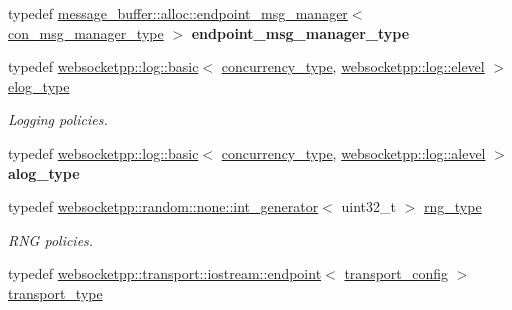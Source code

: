 \begin{DoxyCompactItemize}
\item 
typedef \hyperlink{classwebsocketpp_1_1message__buffer_1_1alloc_1_1endpoint__msg__manager}{message\+\_\+buffer\+::alloc\+::endpoint\+\_\+msg\+\_\+manager}$<$ \hyperlink{classwebsocketpp_1_1message__buffer_1_1alloc_1_1con__msg__manager}{con\+\_\+msg\+\_\+manager\+\_\+type} $>$ {\bfseries endpoint\+\_\+msg\+\_\+manager\+\_\+type}\hypertarget{structwebsocketpp_1_1config_1_1debug__core_a02b1cc8ce11213011104049aeba57866}{}\label{structwebsocketpp_1_1config_1_1debug__core_a02b1cc8ce11213011104049aeba57866}

\item 
typedef \hyperlink{classwebsocketpp_1_1log_1_1basic}{websocketpp\+::log\+::basic}$<$ \hyperlink{classwebsocketpp_1_1concurrency_1_1basic}{concurrency\+\_\+type}, \hyperlink{structwebsocketpp_1_1log_1_1elevel}{websocketpp\+::log\+::elevel} $>$ \hyperlink{structwebsocketpp_1_1config_1_1debug__core_acfa1ded7f80d6a7276b0ec3fd0859fc3}{elog\+\_\+type}\hypertarget{structwebsocketpp_1_1config_1_1debug__core_acfa1ded7f80d6a7276b0ec3fd0859fc3}{}\label{structwebsocketpp_1_1config_1_1debug__core_acfa1ded7f80d6a7276b0ec3fd0859fc3}

\begin{DoxyCompactList}\small\item\em Logging policies. \end{DoxyCompactList}\item 
typedef \hyperlink{classwebsocketpp_1_1log_1_1basic}{websocketpp\+::log\+::basic}$<$ \hyperlink{classwebsocketpp_1_1concurrency_1_1basic}{concurrency\+\_\+type}, \hyperlink{structwebsocketpp_1_1log_1_1alevel}{websocketpp\+::log\+::alevel} $>$ {\bfseries alog\+\_\+type}\hypertarget{structwebsocketpp_1_1config_1_1debug__core_a2e57e38001385110ce0fbbd17af6b0af}{}\label{structwebsocketpp_1_1config_1_1debug__core_a2e57e38001385110ce0fbbd17af6b0af}

\item 
typedef \hyperlink{classwebsocketpp_1_1random_1_1none_1_1int__generator}{websocketpp\+::random\+::none\+::int\+\_\+generator}$<$ uint32\+\_\+t $>$ \hyperlink{structwebsocketpp_1_1config_1_1debug__core_ae59c72992beaef76957c8bfe407394e8}{rng\+\_\+type}\hypertarget{structwebsocketpp_1_1config_1_1debug__core_ae59c72992beaef76957c8bfe407394e8}{}\label{structwebsocketpp_1_1config_1_1debug__core_ae59c72992beaef76957c8bfe407394e8}

\begin{DoxyCompactList}\small\item\em R\+NG policies. \end{DoxyCompactList}\item 
typedef \hyperlink{classwebsocketpp_1_1transport_1_1iostream_1_1endpoint}{websocketpp\+::transport\+::iostream\+::endpoint}$<$ \hyperlink{structwebsocketpp_1_1config_1_1debug__core_1_1transport__config}{transport\+\_\+config} $>$ \hyperlink{structwebsocketpp_1_1config_1_1debug__core_ac4daf5769128b2154a4b1f66e60e0e43}{transport\+\_\+type}\hypertarget{structwebsocketpp_1_1config_1_1debug__core_ac4daf5769128b2154a4b1f66e60e0e43}{}\label{structwebsocketpp_1_1config_1_1debug__core_ac4daf5769128b2154a4b1f66e60e0e43}


\end{DoxyCompactItemize}
